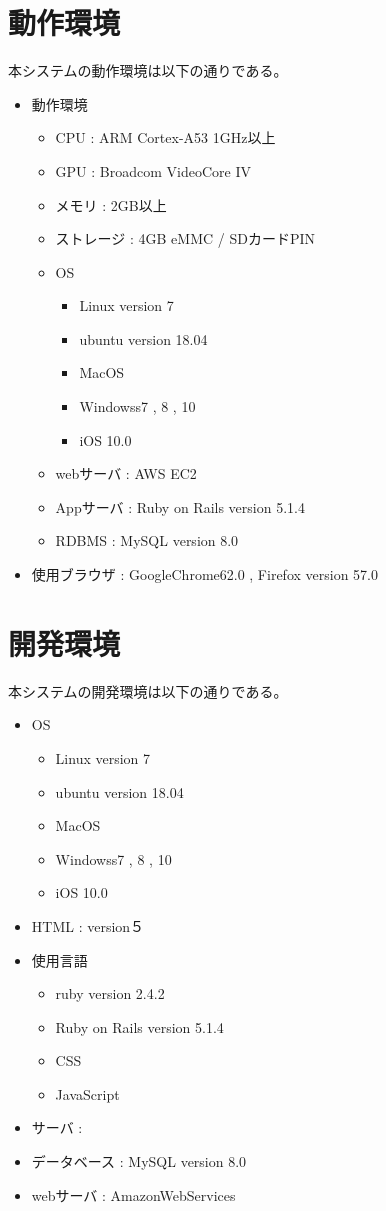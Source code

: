 \documentclass[a4j]{jarticle}
\begin{document}
 \section{動作環境}
本システムの動作環境は以下の通りである。
\begin{itemize}
\item 動作環境
	\begin{itemize}
	\item CPU : ARM Cortex-A53 1GHz以上
	\item GPU : Broadcom VideoCore IV
	\item メモリ : 2GB以上
	\item ストレージ : 4GB eMMC / SDカードPIN
	\item OS
	\begin{itemize}
		\item Linux version 7
		\item ubuntu version 18.04
		\item MacOS
		\item Windowss7 , 8 , 10
		\item iOS 10.0
	\end{itemize}
	\item webサーバ : AWS EC2
	\item Appサーバ : Ruby on Rails version 5.1.4
	\item RDBMS : MySQL version 8.0
	\end{itemize}
\item 使用ブラウザ : GoogleChrome62.0 , Firefox version 57.0%
\end{itemize}
\section{開発環境}
本システムの開発環境は以下の通りである。
\begin{itemize}
\item OS
	\begin{itemize}
		\item Linux version 7
		\item ubuntu version 18.04
		\item MacOS
		\item Windowss7 , 8 , 10
		\item iOS 10.0
	\end{itemize}
\item HTML : version５
\item 使用言語
	\begin{itemize}
	\item ruby version 2.4.2
	\item Ruby on Rails version 5.1.4
	\item CSS
	\item JavaScript
	\end{itemize}
\item サーバ :
\item データベース : MySQL version 8.0
\item webサーバ : AmazonWebServices
\end{itemize}
\end{document}
